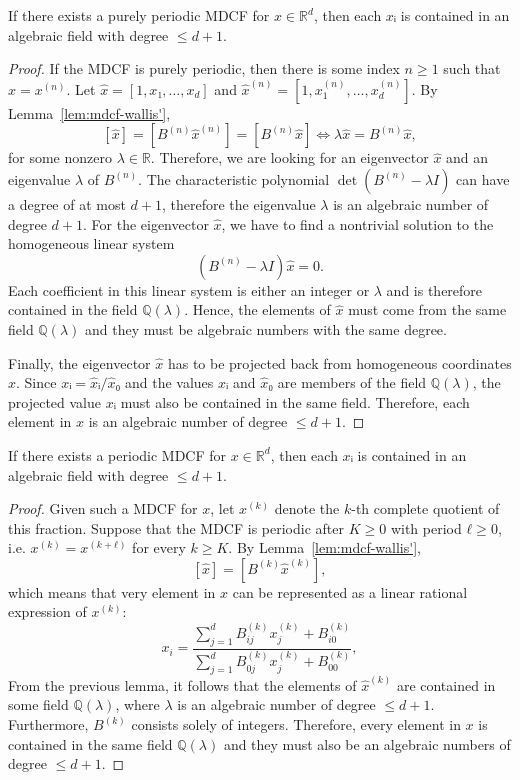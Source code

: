 \begin{lemma}
  \label{lem:mdcf-purely-periodic}
  If there exists a purely periodic MDCF for $x ∈ ℝ^d$,
  then each $xᵢ$ is contained in an algebraic field with degree $≤ d+1$.
\end{lemma}

\begin{proof}
  If the MDCF is purely periodic, then there is some index $n ≥ 1$ such that $x = x^{(n)}$.
  Let $\hat x = [1, x₁, …, x_d]$ and $\hat x^{(n)} = [1, x_1^{(n)}, …, x_d^{(n)}]$.
  By Lemma~\ref{lem:mdcf-wallis'},
  \[
    [\hat x] = [B^{(n)} \hat x^{(n)}] = [B^{(n)} \hat x] \iff λ \hat x = B^{(n)} \hat x,
  \]
  for some nonzero $λ ∈ ℝ$.
  Therefore, we are looking for an eigenvector $\hat x$ and an eigenvalue $λ$ of $B^{(n)}$.
  The characteristic polynomial $\det(B^{(n)} - λ I)$ can have a degree of at most $d+1$,
  therefore the eigenvalue $λ$ is an algebraic number of degree $d+1$.
  For the eigenvector $\hat x$, we have to find a nontrivial solution to the
  homogeneous linear system
  \[
    (B^{(n)} - λ I) \hat x = 0.
  \]
  Each coefficient in this linear system is either an integer or $λ$ and is
  therefore contained in the field $ℚ(λ)$.
  Hence, the elements of $\hat x$ must come from the same
  field $ℚ(λ)$ and they must be algebraic numbers with the same degree.

  Finally, the eigenvector $\hat x$ has to be projected back from homogeneous coordinates $x$.
  Since $xᵢ = \hat xᵢ / \hat x₀$ and the values $\hat xᵢ$ and $\hat x₀$ are members of the field $ℚ(λ)$,
  the projected value $xᵢ$ must also be contained in the same field.
  Therefore, each element in $x$ is an algebraic number of degree $≤ d+1$.
\end{proof}

\begin{theorem}
  \label{thm:mdcf-periodic}
  If there exists a periodic MDCF for $x ∈ ℝ^d$,
  then each $xᵢ$ is contained in an algebraic field with degree $≤ d+1$.
\end{theorem}

\begin{proof}
  Given such a MDCF for $x$, let $x^{(k)}$ denote the $k$-th complete quotient
  of this fraction.
  Suppose that the MDCF is periodic after $K ≥ 0$ with period $ℓ ≥ 0$, i.e.
  $x^{(k)} = x^{(k+ℓ)}$ for every $k ≥ K$.
  By Lemma~\ref{lem:mdcf-wallis'},
  \[
    [\hat x] = [B^{(k)} \hat x^{(k)}],
  \]
  which means that very element in $x$ can be represented as a linear rational
  expression of $x^{(k)}$:
  \[
    x_i = \frac{∑_{j=1}^d B_{ij}^{(k)} x_j^{(k)} + B_{i0}^{(k)}}{\sum_{j=1}^d B_{0j}^{(k)} x_j^{(k)} + B_{00}^{(k)}},
  \]
  From the previous lemma, it follows that the elements of $\hat x^{(k)}$
  are contained in some field $ℚ(λ)$, where $λ$ is an algebraic number of degree $≤ d+1$.
  Furthermore, $B^{(k)}$ consists solely of integers.
  Therefore, every element in $x$ is contained in the same field $ℚ(λ)$
  and they must also be an algebraic numbers of degree $≤ d+1$.
\end{proof}

